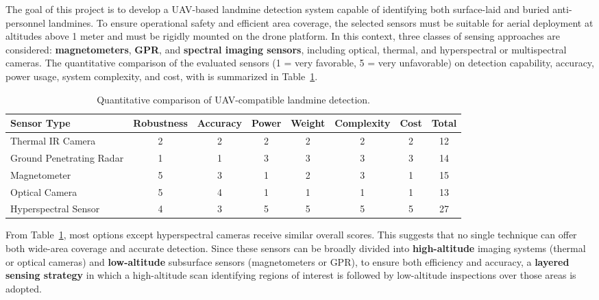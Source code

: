 The goal of this project is to develop a \gls{UAV}-based landmine detection system capable of identifying both surface-laid and buried anti-personnel landmines. To ensure operational safety and efficient area coverage, the selected sensors must be suitable for aerial deployment at altitudes above 1 meter and must be rigidly mounted on the drone platform. In this context, three classes of sensing approaches are considered: \textbf{magnetometers}, \textbf{\gls{GPR}}, and \textbf{spectral imaging sensors}, including optical, thermal, and hyperspectral or multispectral cameras. The quantitative comparison of the evaluated sensors (1 = very favorable, 5 = very unfavorable) on detection capability, accuracy, power usage, system complexity, and cost, with is summarized in Table~\ref{tab:sensor_comparison}.


\begin{table}[h]
    \centering
    \small
    \renewcommand{\arraystretch}{1.3}
    \caption{Quantitative comparison of \gls{UAV}-compatible landmine detection.}
    \label{tab:sensor_comparison}
    \begin{tabular}{l c c c c c c c}
        \toprule
        \textbf{Sensor Type} & \textbf{Robustness} & \textbf{Accuracy} & \textbf{Power} & \textbf{Weight} & \textbf{Complexity} & \textbf{Cost} & \textbf{Total} \\
        \midrule
        Thermal \gls{IR} Camera        & 2 & 2 & 2 & 2 & 2 & 2 & 12 \\
        Ground Penetrating Radar & 1 & 1 & 3 & 3 & 3 & 3 & 14 \\
        Magnetometer             & 5 & 3 & 1 & 2 & 3 & 1 & 15 \\
        Optical Camera           & 5 & 4 & 1 & 1 & 1 & 1 & 13 \\
        Hyperspectral Sensor     & 4 & 3 & 5 & 5 & 5 & 5 & 27 \\
        \bottomrule
    \end{tabular}
\end{table}

From Table~\ref{tab:sensor_comparison}, most options except hyperspectral cameras receive similar overall scores. This suggests that no single technique can offer both wide-area coverage and accurate detection. Since these sensors can be broadly divided into \textbf{high-altitude} imaging systems (thermal or optical cameras) and \textbf{low-altitude} subsurface sensors (magnetometers or \gls{GPR}), to ensure both efficiency and accuracy, a \textbf{layered sensing strategy} in which a high-altitude scan identifying regions of interest is followed by low-altitude inspections over those areas is adopted.


